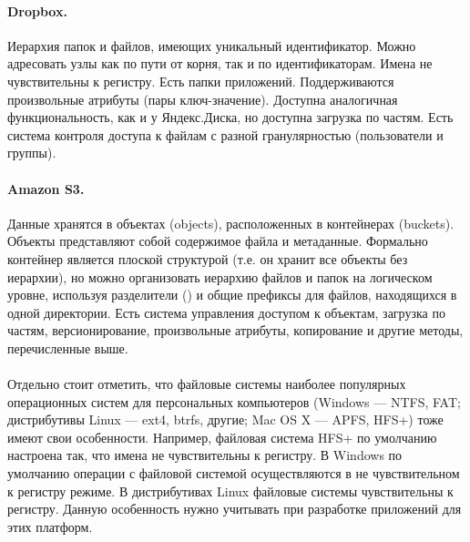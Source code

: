     \paragraph{Dropbox\cite{dropbox-docs}.} Иерархия папок и файлов, имеющих уникальный идентификатор. Можно адресовать узлы как по пути от корня, так и по идентификаторам. Имена не чувствительны к регистру. Есть папки приложений. Поддерживаются произвольные атрибуты (пары ключ-значение). Доступна аналогичная функциональность, как и у Яндекс.Диска, но доступна загрузка по частям. Есть система контроля доступа к файлам с разной гранулярностью (пользователи и группы).

    \paragraph{Amazon S3\cite{amazon-s3-docs}.} Данные хранятся в объектах (objects), расположенных в контейнерах (buckets). Объекты представляют собой содержимое файла и метаданные. Формально контейнер является плоской структурой (т.е. он хранит все объекты без иерархии), но можно организовать иерархию файлов и папок на логическом уровне, используя разделители (\code{/}) и общие префиксы для файлов, находящихся в одной директории. Есть система управления доступом к объектам, загрузка по частям, версионирование, произвольные атрибуты, копирование и другие методы, перечисленные выше.

    \paragraph{} Отдельно стоит отметить, что файловые системы наиболее популярных операционных систем для персональных компьютеров (Windows --- NTFS, FAT; дистрибутивы Linux --- ext4, btrfs, другие; Mac OS X --- APFS, HFS+) тоже имеют свои особенности. Например, файловая система HFS+ по умолчанию настроена так, что имена не чувствительны к регистру. В Windows по умолчанию операции с файловой системой осуществляются в не чувствительном к регистру режиме\cite{windows-case-sensitivity}. В дистрибутивах Linux файловые системы чувствительны к регистру. Данную особенность нужно учитывать при разработке приложений для этих платформ.

